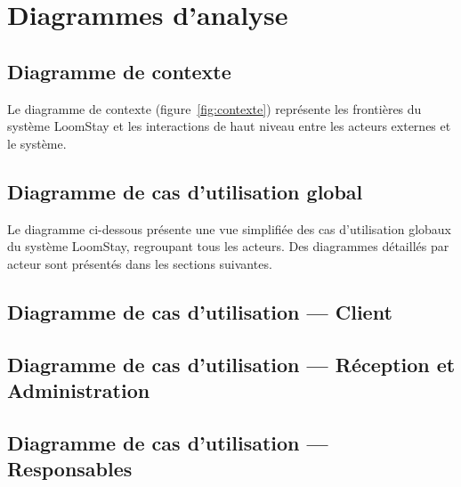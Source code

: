 \section{Diagrammes d'analyse}
\label{sec:diagrammes_analyse}

\subsection{Diagramme de contexte}

Le diagramme de contexte (figure~\ref{fig:contexte}) représente les frontières du système LoomStay et les interactions de haut niveau entre les acteurs externes et le système.

\label{fig:contexte}

\subsection{Diagramme de cas d'utilisation global}

Le diagramme ci-dessous présente une vue simplifiée des cas d'utilisation globaux du système LoomStay, regroupant tous les acteurs. Des diagrammes détaillés par acteur sont présentés dans les sections suivantes.


\subsection{Diagramme de cas d'utilisation — Client}


\subsection{Diagramme de cas d'utilisation — Réception et Administration}


\subsection{Diagramme de cas d'utilisation — Responsables}



